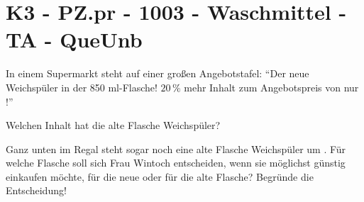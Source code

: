 \section{K3 - PZ.pr - 1003 - Waschmittel - TA - QueUnb}

\begin{beispiel}{0} %
In einem Supermarkt steht auf einer großen Angebotstafel: "`Der neue Weichspüler in der 850 ml-Flasche! $20\,\%$ mehr Inhalt zum Angebotspreis von nur !"'

Welchen Inhalt hat die alte Flasche Weichspüler?

Ganz unten im Regal steht sogar noch eine alte Flasche Weichspüler um . Für welche Flasche soll sich Frau Wintoch entscheiden, wenn sie möglichst günstig einkaufen möchte, für die neue oder für die alte Flasche? Begründe die Entscheidung!

\end{beispiel}